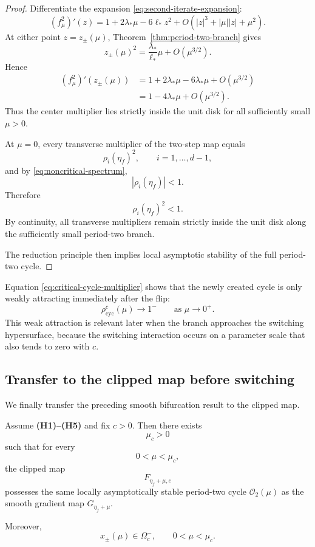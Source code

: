 \begin{proof}
Differentiate the expansion
\eqref{eq:second-iterate-expansion}:
\begin{equation}
(f_\mu^2)'(z)
=
1
+
2\lambda_*\mu
-
6\ell_*z^2
+
O\left(
|z|^3
+
|\mu||z|
+
\mu^2
\right).
\label{eq:second-iterate-derivative}
\end{equation}
At either point $z=z_\pm(\mu)$,
Theorem~\ref{thm:period-two-branch} gives
\[
z_\pm(\mu)^2
=
\frac{\lambda_*}{\ell_*}\mu
+
O(\mu^{3/2}).
\]
Hence
\begin{align}
(f_\mu^2)'(z_\pm(\mu))
&=
1
+
2\lambda_*\mu
-
6\lambda_*\mu
+
O(\mu^{3/2})
\nonumber\\
&=
1
-
4\lambda_*\mu
+
O(\mu^{3/2}).
\end{align}
Thus the center multiplier lies strictly inside the unit disk for
all sufficiently small $\mu>0$.

At $\mu=0$, every transverse multiplier of the two-step map equals
\[
\rho_i(\eta_f)^2,
\qquad
i=1,\ldots,d-1,
\]
and by \eqref{eq:noncritical-spectrum},
\[
|\rho_i(\eta_f)|<1.
\]
Therefore
\[
\rho_i(\eta_f)^2<1.
\]
By continuity, all transverse multipliers remain strictly inside the
unit disk along the sufficiently small period-two branch.

The reduction principle then implies local asymptotic stability of
the full period-two cycle.
\end{proof}

\begin{remark}
\label{rem:cycle-multiplier-meaning}
Equation \eqref{eq:critical-cycle-multiplier} shows that the
newly created cycle is only weakly attracting immediately after the
flip:
\[
\rho_{\mathrm{cyc}}^{c}(\mu)\to1^-
\qquad
\text{as }\mu\to0^+.
\]
This weak attraction is relevant later when the branch approaches
the switching hypersurface, because the switching interaction occurs
on a parameter scale that also tends to zero with $c$.
\end{remark}

\subsection{Transfer to the clipped map before switching}
\label{subsec:transfer-clipped}

We finally transfer the preceding smooth bifurcation result to the
clipped map.

\begin{corollary}
\label{cor:precontact-clipped-cycle}
Assume \textbf{(H1)--(H5)} and fix $c>0$.
Then there exists
\[
\mu_c>0
\]
such that for every
\[
0<\mu<\mu_c,
\]
the clipped map
\[
F_{\eta_f+\mu,c}
\]
possesses the same locally asymptotically stable period-two cycle
$\mathcal O_2(\mu)$ as the smooth gradient map
$G_{\eta_f+\mu}$.

Moreover,
\begin{equation}
x_\pm(\mu)
\in
\Omega_c^-,
\qquad
0<\mu<\mu_c.
\label{eq:cycle-inside-smooth-region}
\end{equation}
\end{corollary}

